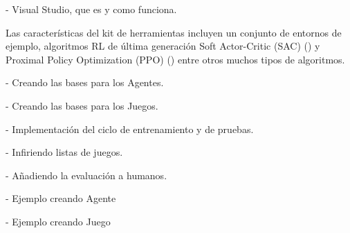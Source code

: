 - Visual Studio, que es y como funciona.

Las características del kit de herramientas incluyen un conjunto de entornos de ejemplo, algoritmos RL de última generación Soft Actor-Critic (SAC) (\cite{haarnoja2018soft}) y Proximal Policy Optimization (PPO) (\cite{schulman2017proximal})  entre otros muchos tipos de algoritmos.



- Creando las bases para los Agentes.

- Creando las bases para los Juegos.

- Implementación del ciclo de entrenamiento y de pruebas.

- Infiriendo listas de juegos.

- Añadiendo la evaluación a humanos.

- Ejemplo creando Agente 

- Ejemplo creando Juego